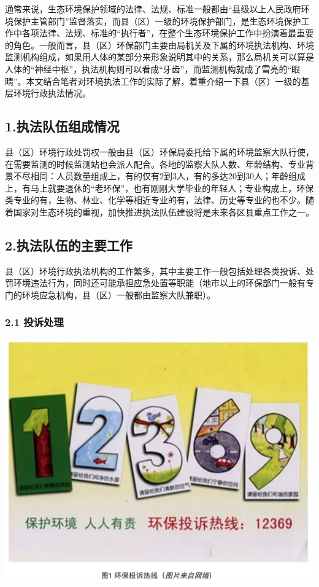 \documentclass[
]{book}
\begin{document}
通常来说，生态环境保护领域的法律、法规、标准一般都由``县级以上人民政府环境保护主管部门''监督落实，而县（区）一级的环境保护部门，是生态环境保护工作中各项法律、法规、标准的``执行者''，在整个生态环境保护工作中扮演着最重要的角色。一般而言，县（区）环保部门主要由局机关及下属的环境执法机构、环境监测机构组成，如果用人体的某部分来形象说明其中的关系，那么局机关可以算是人体的``神经中枢''，执法机构则可以看成``牙齿''，而监测机构就成了雪亮的``眼睛''。本文结合笔者对环境执法工作的实际了解，着重介绍一下县（区）一级的基层环境行政执法情况。

\hypertarget{ux6267ux6cd5ux961fux4f0dux7ec4ux6210ux60c5ux51b5}{%
\subsection{1.执法队伍组成情况}\label{ux6267ux6cd5ux961fux4f0dux7ec4ux6210ux60c5ux51b5}}

县（区）环境行政处罚权一般由县（区）环保局委托给下属的环境监察大队行使，在需要监测的时候监测站也会派人配合。各地的监察大队人数、年龄结构、专业背景不尽相同：人员数量组成上，有的仅有2到3人，有的多达20到30人；年龄组成上，有马上就要退休的``老环保''，也有刚刚大学毕业的年轻人；专业构成上，环保类专业的有，生物、林业、化学等相近专业的有，法律、历史等专业的也不少。随着国家对生态环境的重视，加快推进执法队伍建设将是未来各区县重点工作之一。

\hypertarget{ux6267ux6cd5ux961fux4f0dux7684ux4e3bux8981ux5de5ux4f5c}{%
\subsection{2.执法队伍的主要工作}\label{ux6267ux6cd5ux961fux4f0dux7684ux4e3bux8981ux5de5ux4f5c}}

县（区）环境行政执法机构的工作繁多，其中主要工作一般包括处理各类投诉、处罚环境违法行为，同时还可能承担应急处置等职能（地市以上的环保部门一般有专门的环境应急机构，县（区）一般都由监察大队兼职）。

\hypertarget{ux6295ux8bc9ux5904ux7406}{%
\subsubsection{2.1 投诉处理}\label{ux6295ux8bc9ux5904ux7406}}

\includegraphics[width=8.33in]{images/hjzf1}
\end{document}
